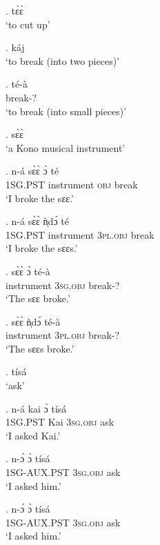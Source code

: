 \documentclass{assets/fieldnotes}
\begin{document}

\ex. tɛ̀ɛ̀\\
`to cut up’

\ex. káj\\
`to break (into two pieces)’

\exg. té-à\\
break-?\\
`to break (into small pieces)’

\ex. sɛ̀ɛ̀\\
`a Kono musical instrument’

\exg. n-á sɛ̀ɛ̀ ɔ̀ té\\
\textsc{1SG.PST} instrument \textsc{obj} break\\
‘I broke the sɛɛ.’

\exg. n-á sɛ̀ɛ̀ ǹ̩dɔ́ té\\
\textsc{1SG.PST} instrument \textsc{3pl.obj} break\\
‘I broke the sɛɛs.’

\exg. sɛ̀ɛ̀ ɔ̀ té-à\\
instrument \textsc{3sg.obj} break-?\\
‘The sɛɛ broke.’

\exg. sɛ̀ɛ̀ ǹ̩dɔ́ té-à\\
instrument \textsc{3pl.obj} break-?\\
‘The sɛɛs broke.’

\ex. tísá\\
`ask’

\exg. n-á kai ɔ̀ tísá\\
\textsc{1SG.PST} Kai \textsc{3sg.obj} ask\\
`I asked Kai.’

\exg. n-ɔ́ ɔ̀ tísá\\
\textsc{1SG-AUX.PST} \textsc{3sg.obj} ask\\
`I asked him.’\\

\exg. n-ɔ́ ɔ̀ tísá\\
\textsc{1SG-AUX.PST} \textsc{3sg.obj} ask\\
`I asked him.’
\end{document}
